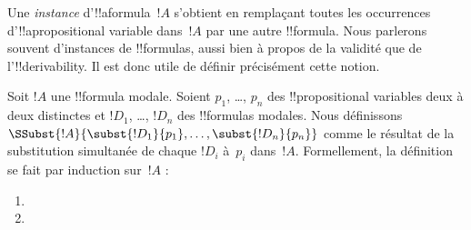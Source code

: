\documentclass[../../../include/open-logic-section]{subfiles}
\begin{document}


Une \emph{instance} d'!!a{formula}~$!A$ s'obtient en remplaçant
toutes les occurrences d'!!a{propositional variable} dans~$!A$
par une autre !!{formula}. Nous parlerons souvent d'instances de
!!{formula}s, aussi bien à propos de la validité que de
l'!!{derivability}. Il est donc utile de définir précisément cette
notion.

\begin{defn}
  Soit $!A$ une !!{formula} modale. Soient $p_1$, \dots, $p_n$ des
  !!{propositional variable}s deux à deux distinctes et $!D_1$, \dots,
  $!D_n$ des !!{formula}s modales. Nous définissons
  $\SSubst{!A}{\subst{!D_1}{p_1}, \dots, \subst{!D_n}{p_n}}$ comme le
  résultat de la substitution simultanée de chaque $!D_i$ à~$p_i$
  dans~$!A$. Formellement, la définition se fait par induction
  sur~$!A$ :
  \begin{enumerate}
    \item {}
    \item {}
\end{enumerate}
\end{defn}
\end{document}
